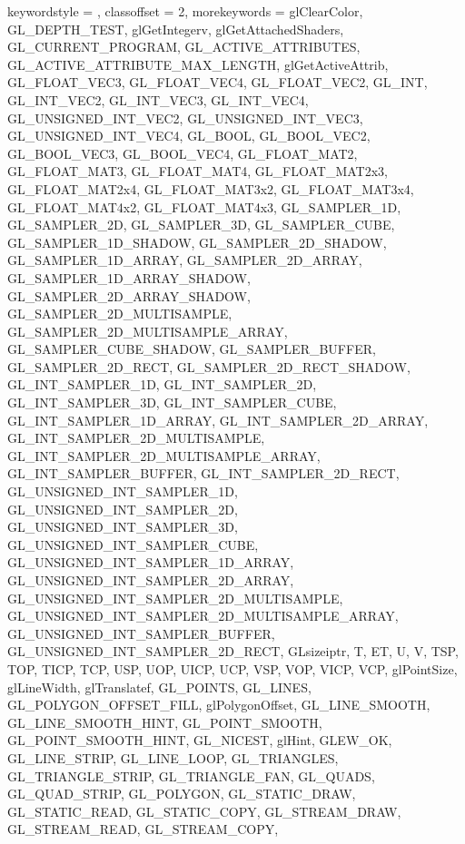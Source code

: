 {{		keywordstyle = {\color[rgb]{0.0, 0.0, 0.70}},
		classoffset = 2,
		morekeywords = {
            glClearColor,
            GL_DEPTH_TEST,
        glGetIntegerv, 
        glGetAttachedShaders,
        GL_CURRENT_PROGRAM,
        GL_ACTIVE_ATTRIBUTES,
        GL_ACTIVE_ATTRIBUTE_MAX_LENGTH,
        glGetActiveAttrib,
        GL_FLOAT_VEC3,
        GL_FLOAT_VEC4,
        GL_FLOAT_VEC2,
        GL_INT,
        GL_INT_VEC2,
        GL_INT_VEC3,
        GL_INT_VEC4,
        GL_UNSIGNED_INT_VEC2,
        GL_UNSIGNED_INT_VEC3,
        GL_UNSIGNED_INT_VEC4,
        GL_BOOL,
        GL_BOOL_VEC2,
        GL_BOOL_VEC3,
        GL_BOOL_VEC4,
        GL_FLOAT_MAT2,
        GL_FLOAT_MAT3,
        GL_FLOAT_MAT4,
        GL_FLOAT_MAT2x3,
        GL_FLOAT_MAT2x4,
        GL_FLOAT_MAT3x2,
        GL_FLOAT_MAT3x4,
        GL_FLOAT_MAT4x2,
        GL_FLOAT_MAT4x3,
        GL_SAMPLER_1D,
        GL_SAMPLER_2D,
        GL_SAMPLER_3D,
        GL_SAMPLER_CUBE,
        GL_SAMPLER_1D_SHADOW,
        GL_SAMPLER_2D_SHADOW,
        GL_SAMPLER_1D_ARRAY,
        GL_SAMPLER_2D_ARRAY,
        GL_SAMPLER_1D_ARRAY_SHADOW,
        GL_SAMPLER_2D_ARRAY_SHADOW,
        GL_SAMPLER_2D_MULTISAMPLE,
        GL_SAMPLER_2D_MULTISAMPLE_ARRAY,
        GL_SAMPLER_CUBE_SHADOW,
        GL_SAMPLER_BUFFER,
        GL_SAMPLER_2D_RECT,
        GL_SAMPLER_2D_RECT_SHADOW,
        GL_INT_SAMPLER_1D,
        GL_INT_SAMPLER_2D,
        GL_INT_SAMPLER_3D,
        GL_INT_SAMPLER_CUBE,
        GL_INT_SAMPLER_1D_ARRAY,
        GL_INT_SAMPLER_2D_ARRAY,
        GL_INT_SAMPLER_2D_MULTISAMPLE,
        GL_INT_SAMPLER_2D_MULTISAMPLE_ARRAY,
        GL_INT_SAMPLER_BUFFER,
        GL_INT_SAMPLER_2D_RECT,
        GL_UNSIGNED_INT_SAMPLER_1D,
        GL_UNSIGNED_INT_SAMPLER_2D,
        GL_UNSIGNED_INT_SAMPLER_3D,
        GL_UNSIGNED_INT_SAMPLER_CUBE,
        GL_UNSIGNED_INT_SAMPLER_1D_ARRAY,
        GL_UNSIGNED_INT_SAMPLER_2D_ARRAY,
        GL_UNSIGNED_INT_SAMPLER_2D_MULTISAMPLE,
        GL_UNSIGNED_INT_SAMPLER_2D_MULTISAMPLE_ARRAY,
        GL_UNSIGNED_INT_SAMPLER_BUFFER,
        GL_UNSIGNED_INT_SAMPLER_2D_RECT,
        GLsizeiptr,
        T, ET, U, V, TSP, TOP, TICP, TCP, USP, UOP, UICP, UCP, VSP, VOP, VICP, VCP, glPointSize, glLineWidth, glTranslatef,
		GL_POINTS, GL_LINES, GL_POLYGON_OFFSET_FILL, glPolygonOffset, GL_LINE_SMOOTH, GL_LINE_SMOOTH_HINT, GL_POINT_SMOOTH, GL_POINT_SMOOTH_HINT, GL_NICEST, glHint, GLEW_OK, GL_LINE_STRIP, GL_LINE_LOOP, GL_TRIANGLES, GL_TRIANGLE_STRIP, GL_TRIANGLE_FAN, GL_QUADS, GL_QUAD_STRIP, GL_POLYGON,
		GL_STATIC_DRAW, GL_STATIC_READ, GL_STATIC_COPY,
		GL_STREAM_DRAW, GL_STREAM_READ, GL_STREAM_COPY,
}}}
